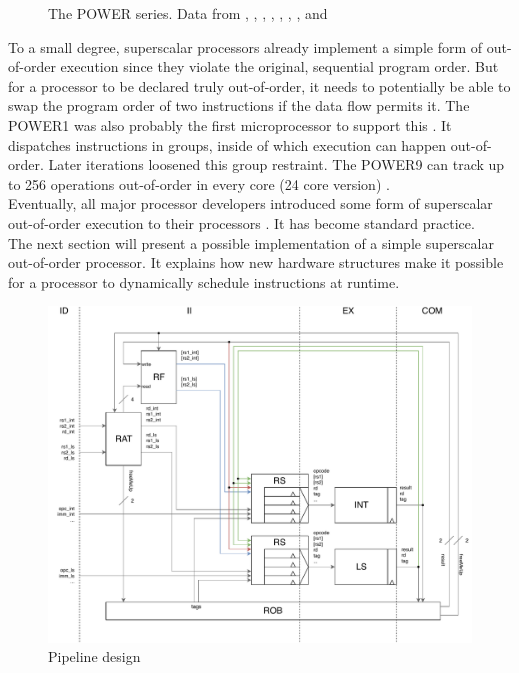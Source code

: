 \documentclass[12pt,a4paper]{article} %
\begin{document}
\begin{figure} [htb!]
	\caption{\small The POWER series. Data from \cite{power1}, \cite{power2}, \cite{power3}, \cite{power4},
	\cite{power5}, \cite{power6}, \cite{power7}, \cite{power8} and
	\cite{power9}}%
	\label{fig-POWER}
\end{figure}%

To a small degree, superscalar processors already implement a simple form of out-of-order execution since they violate the original, sequential program order. But for a processor to be declared truly out-of-order, it needs to potentially be able to swap the program order of two instructions if the data flow permits it. The POWER1 was also probably the first microprocessor to support this \cite{power1}. It dispatches instructions in groups, inside of which execution can happen out-of-order. Later iterations loosened this group restraint. The POWER9 can track up to 256 operations out-of-order in every core (24 core version) \cite{power9}.\\
Eventually, all major processor developers introduced some form of superscalar out-of-order execution to their processors \cite{intelSM} \cite{amdSM}. It has become standard practice.\\

The next section will present a possible implementation of a simple superscalar out-of-order processor. It explains how new hardware structures make it possible for a processor to dynamically schedule instructions at runtime.



\begin{figure}[!p]
	\centering
	\includegraphics[height = \textwidth, angle = 90]{Source/pipeline.pdf}
	\caption{Pipeline design}
	\label{fig-pipeline}
\end{figure}
\newpage
\end{document}

